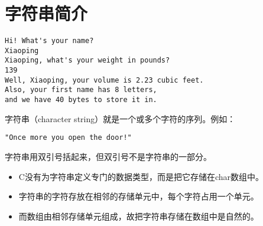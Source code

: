 \section{字符串简介}

\begin{frame} \ft{\secname}

\end{frame}


\begin{frame}[fragile] \ft{\secname}
\begin{lstlisting}
Hi! What's your name?
Xiaoping
Xiaoping, what's your weight in pounds?
139
Well, Xiaoping, your volume is 2.23 cubic feet.
Also, your first name has 8 letters, 
and we have 40 bytes to store it in.
\end{lstlisting}
\end{frame}

\begin{frame}[fragile] \ft{\secname}
\begin{dingyi}
字符串（character string）就是一个或多个字符的序列。例如：
\begin{lstlisting}
"Once more you open the door!"
\end{lstlisting}

\end{dingyi}
\vspace{0.1in}

\begin{zhu}
字符串用双引号括起来，但双引号不是字符串的一部分。
\end{zhu}
\end{frame}

\begin{frame} \ft{\secname}
\begin{itemize}
\item
C没有为字符串定义专门的数据类型，而是把它存储在char数组中。
\\[0.2in]
\item
字符串的字符存放在相邻的存储单元中，每个字符占用一个单元。
\\[0.2in]
\item
而数组由相邻存储单元组成，故把字符串存储在数组中是自然的。
\end{itemize}
\end{frame}



